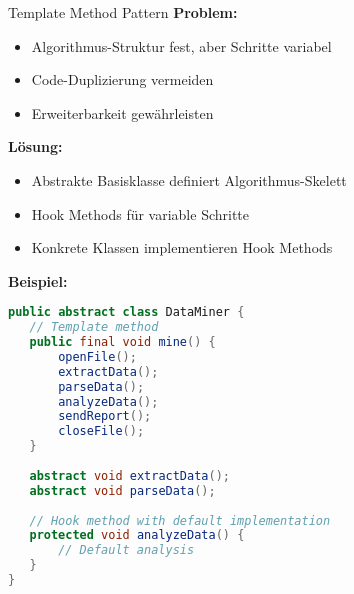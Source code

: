 \begin{definition}{Template Method Pattern}
\textbf{Problem:}
\begin{itemize}
   \item Algorithmus-Struktur fest, aber Schritte variabel
   \item Code-Duplizierung vermeiden
   \item Erweiterbarkeit gewährleisten
\end{itemize}

\textbf{Lösung:}
\begin{itemize}
   \item Abstrakte Basisklasse definiert Algorithmus-Skelett
   \item Hook Methods für variable Schritte
   \item Konkrete Klassen implementieren Hook Methods
\end{itemize}

\textbf{Beispiel:}
\begin{lstlisting}[language=Java, style=basesmol]
public abstract class DataMiner {
   // Template method
   public final void mine() {
       openFile();
       extractData();
       parseData();
       analyzeData();
       sendReport();
       closeFile();
   }
   
   abstract void extractData();
   abstract void parseData();
   
   // Hook method with default implementation
   protected void analyzeData() {
       // Default analysis
   }
}
\end{lstlisting}
\end{definition}

